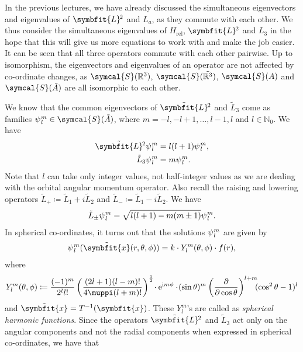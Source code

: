 \documentclass[12pt, a4 paper]{article}
\theoremstyle{definition}
\newcommand{\rthree}{\mathbb{R}^3}
\newcommand{\rr}{\mathbb{R}}
\newcommand{\nn}{\mathbb{N}_0}
\newcommand{\schwartz}{\symcal{S}}
\newcommand{\schwartzrthree}{\schwartz(\rr^3)}
\renewcommand{\i}{\mathrm{i}}
\newcommand{\e}{\mathrm{e}}
\renewcommand{\pi}{\muppi}
\newcommand{\lvecsquare}{\tilde{\symbfit{L}}\kern-1pt^2}
\begin{document}
	In the previous lectures, we have already discussed the simultaneous eigenvectors and eigenvalues of $\symbfit{L}\kern-1pt^2$ and $L_a$, as they commute with each other. We thus consider the simultaneous eigenvalues of $H_\text{rel}$, $\symbfit{L}\kern-1pt^2$ and $L_3$ in the hope that this will give us more equations to work with and make the job easier. It can be seen that all three operators commute with each other pairwise. Up to isomorphism, the eigenvectors and eigenvalues of an operator are not affected by co-ordinate changes, as $\schwartzrthree$, $\schwartz(\tilde{\rthree})$, $\schwartz(A)$ and $\schwartz(\tilde{A})$ are all isomorphic to each other.

	We know that the common eigenvectors of $\lvecsquare$ and $\tilde{L}_3$ come as families $\psi\kern0.5pt_l^m \in \schwartz(\tilde{A})$, where $m = -l, -l+1, \ldots, l-1, l$ and $l \in \nn$. We have
	\begin{align*}
	    \lvecsquare \psi\kern0.5pt_l^m &= l(l+1)\psi\kern0.5pt_l^m,\\
		\tilde{L}_3 \psi\kern0.5pt_l^m &= m \psi\kern0.5pt_l^m.
	\end{align*}
	Note that $l$ can take only integer values, not half-integer values as we are dealing with the orbital angular momentum operator. Also recall the raising and lowering operators $\tilde{L}_+ \coloneq \tilde{L}_1 + i \tilde{L}_2$ and $\tilde{L}_- \coloneq \tilde{L}_1 - i\tilde{L}_2$. We have
	\begin{align*}
		\tilde{L}_\pm \psi\kern0.5pt_l^m = \sqrt{l(l+1) - m(m\pm 1)} \psi\kern0.5pt_l^m.
	\end{align*}
	In spherical co-ordinates, it turns out that the solutions $\psi\kern0.5pt_l^m$ are given by
	\begin{align*}
		\psi\kern0.5pt_l^m (\tilde{\symbfit{x}} (r, \theta, \phi)) = k \cdot Y^m_l (\theta, \phi) \cdot f(r),
	\end{align*}
	where
	\begin{align*}
		Y^m_l (\theta, \phi) \coloneq \frac{(-1)^m}{2^l l!}\left(\frac{(2l+1) (l-m)!}{4\pi (l+m)!}\right)^{\frac{1}{2}}\!\cdot\e^{\i m\phi}\cdot\!(\sin{\theta})^m \left(\frac{\partial}{\partial \cos{\theta}}\right)^{l+m}\!\!\!(\cos^2{\theta} -1)^l
	\end{align*}
	and $\tilde{\symbfit{x}} = T^{-1}(\symbfit{x})$. These $Y_l^m$'s are called as \textit{spherical harmonic functions}. Since the operators $\lvecsquare$ and $\tilde{L}_3$ act only on the angular components and not the radial components when expressed in spherical co-ordinates, we have that
\end{document}
